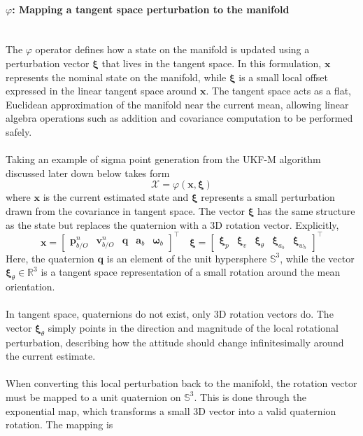 \paragraph{$\varphi$: Mapping a tangent space perturbation to the manifold} \mbox{}\\[0.5em] \noindent
The $\varphi$ operator defines how a state on the manifold is updated using a perturbation vector $\boldsymbol{\xi}$ that lives in the tangent space. In this formulation, $\mathbf{x}$ represents the nominal state on the manifold, while $\boldsymbol{\xi}$ is a small local offset expressed in the linear tangent space around $\mathbf{x}$. The tangent space acts as a flat, Euclidean approximation of the manifold near the current mean, allowing linear algebra operations such as addition and covariance computation to be performed safely.
\\ \\
Taking an example of sigma point generation from the UKF-M algorithm discussed later down below takes form
$$
    \mathcal{X} = \varphi(\mathbf{x}, \boldsymbol{\xi})
$$
where $\mathbf{x}$ is the current estimated state and $\boldsymbol{\xi}$ represents a small perturbation drawn from the covariance in tangent space. The vector $\boldsymbol{\xi}$ has the same structure as the state but replaces the quaternion with a 3D rotation vector. Explicitly,
$$
    \mathbf{x} =
    \begin{bmatrix}
        \mathbf{p}_{b/O}^{n} & \mathbf{v}_{b/O}^{n} & \mathbf{q} & \mathbf{a}_b & \mathbf{\omega}_b
    \end{bmatrix}^\top \quad
    \boldsymbol{\xi} =
    \begin{bmatrix}
        \boldsymbol{\xi}_{p} & \boldsymbol{\xi}_{v} & \boldsymbol{\xi}_{\theta} & \boldsymbol{\xi}_{a_b} & \boldsymbol{\xi}_{w_b}
    \end{bmatrix}^\top
$$
Here, the quaternion $\mathbf{q}$ is an element of the unit hypersphere $\mathbb{S}^3$, while the vector $\boldsymbol{\xi}_{\theta} \in \mathbb{R}^3$ is a tangent space representation of a small rotation around the mean orientation.
\\ \\
In tangent space, quaternions do not exist, only 3D rotation vectors do. The vector $\boldsymbol{\xi}_{\theta}$ simply points in the direction and magnitude of the local rotational perturbation, describing how the attitude should change infinitesimally around the current estimate.
\\ \\
When converting this local perturbation back to the manifold, the rotation vector must be mapped to a unit quaternion on $\mathbb{S}^3$. This is done through the exponential map, which transforms a small 3D vector into a valid quaternion rotation. The mapping is
